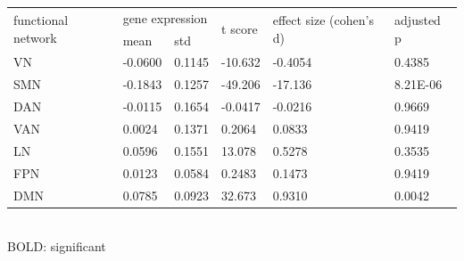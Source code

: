 \begin{refsection}
\begin{table}[H]
\small
{}\selectfont
{} \label{table3S3} 
\centering
\begin{tabular}{@{}llllll@{}}
\hline
\multirow{2}{*}{functional network} & \multicolumn{2}{l}{gene expression} & \multirow{2}{*}{t score} & \multirow{2}{*}{effect size (cohen's d)} & \multirow{2}{*}{adjusted p} \\ \cmidrule(lr){2-3}
                                    & mean              & std             &                          &                                          &                                   \\ \hline 
VN                                  & -0.0600           & 0.1145          & -10.632                  & -0.4054                                  & 0.4385                            \\
SMN                                 & -0.1843           & 0.1257          & -49.206                  & -17.136                                  & 8.21E-06                          \\
DAN                                 & -0.0115           & 0.1654          & -0.0417                  & -0.0216                                  & 0.9669                            \\
VAN                                 & 0.0024            & 0.1371          & 0.2064                   & 0.0833                                   & 0.9419                            \\
LN                                  & 0.0596            & 0.1551          & 13.078                   & 0.5278                                   & 0.3535                            \\
FPN                                 & 0.0123            & 0.0584          & 0.2483                   & 0.1473                                   & 0.9419                            \\
DMN                                 & 0.0785            & 0.0923          & 32.673                   & 0.9310                                   & 0.0042                            \\ \hline
\end{tabular}\\
{\scriptsize BOLD: significant}
\end{table}




\end{refsection}

